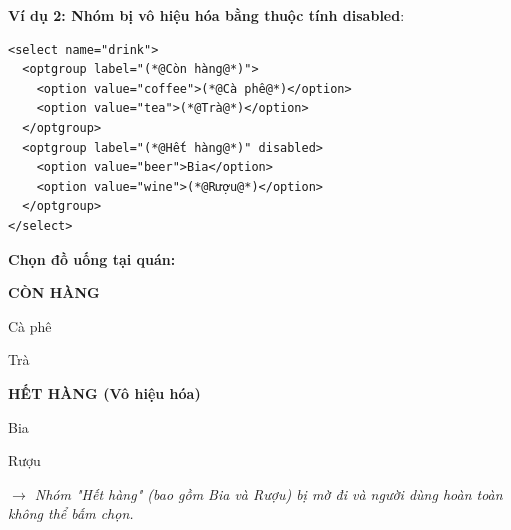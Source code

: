 \documentclass[11pt,oneside]{book}
\begin{document}
\textbf{Ví dụ 2: Nhóm bị vô hiệu hóa bằng thuộc tính disabled}:
\begin{codeWindow}
\begin{lstlisting}[language=HTML5]
<select name="drink">
  <optgroup label="(*@Còn hàng@*)">
    <option value="coffee">(*@Cà phê@*)</option>
    <option value="tea">(*@Trà@*)</option>
  </optgroup>
  <optgroup label="(*@Hết hàng@*)" disabled>
    <option value="beer">Bia</option>
    <option value="wine">(*@Rượu@*)</option>
  </optgroup>
</select>
\end{lstlisting}
\end{codeWindow}

\begin{browserWindow}
\sffamily\small
\textbf{Chọn đồ uống tại quán:} \par\vspace{4pt}
\begin{tcolorbox}[arc=2pt, colback=white, colframe=primaryBlue!50, boxsep=4pt, width=0.6\linewidth]
  \small
  \textbf{\textcolor{gray!80}{CÒN HÀNG}} \par\vspace{2pt}
  \quad Cà phê \par\vspace{2pt}
  \quad Trà \par\vspace{3pt}
  \textbf{\textcolor{gray!40}{HẾT HÀNG (Vô hiệu hóa)}} \par\vspace{2pt}
  \quad \textcolor{gray!40}{Bia} \par\vspace{2pt}
  \quad \textcolor{gray!40}{Rượu}
\end{tcolorbox}
\par\vspace{4pt}
\textcolor{codeComment}{\small\textit{$\rightarrow$ Nhóm "Hết hàng" (bao gồm Bia và Rượu) bị mờ đi và người dùng hoàn toàn không thể bấm chọn.}}
\end{browserWindow}
\end{document}
